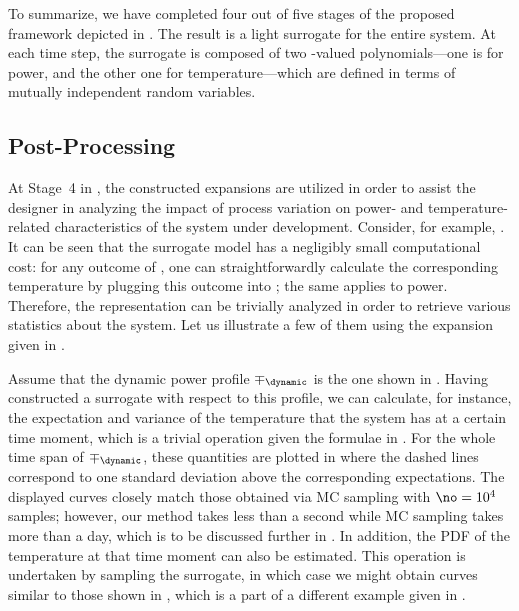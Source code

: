 To summarize, we have completed four out of five stages of the proposed
framework depicted in . The result is a light surrogate for
the entire system. At each time step, the surrogate is composed of two
\np-valued polynomials---one is for power, and the other one for
temperature---which are defined in terms of \nz mutually independent random
variables.

\subsection{Post-Processing}

At Stage~4 in , the constructed expansions are utilized in
order to assist the designer in analyzing the impact of process variation on
power- and temperature-related characteristics of the system under development.
Consider, for example, . It can be seen that the
surrogate model has a negligibly small computational cost: for any outcome of
\vz, one can straightforwardly calculate the corresponding temperature by
plugging this outcome into ; the same applies to
power. Therefore, the representation can be trivially analyzed in order to
retrieve various statistics about the system. Let us illustrate a few of them
using the expansion given in .

Assume that the dynamic power profile $\mp_\dynamic$ is the one shown in
. Having constructed a surrogate with respect to
this profile, we can calculate, for instance, the expectation and variance of
the temperature that the system has at a certain time moment, which is a trivial
operation given the formulae in . For the whole time span of
$\mp_\dynamic$, these quantities are plotted in
 where the dashed lines correspond to one
standard deviation above the corresponding expectations. The displayed curves
closely match those obtained via \ac{MC} sampling with $\no = 10^4$ samples;
however, our method takes less than a second while \ac{MC} sampling takes more
than a day, which is to be discussed further in .
In addition, the \ac{PDF} of the temperature at that time moment can also be
estimated. This operation is undertaken by sampling the surrogate, in which case
we might obtain curves similar to those shown in
, which is a part of a different example given
in .
